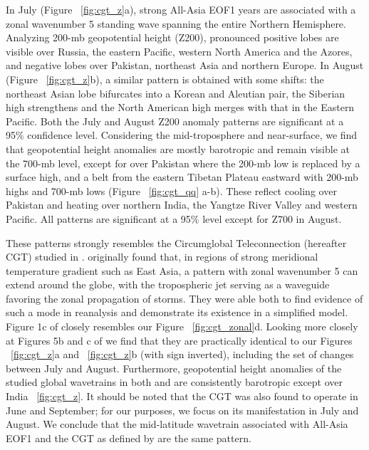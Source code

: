 	In July (Figure ~\ref{fig:cgt_z}a), strong All-Asia EOF1 years are associated with a zonal wavenumber 5 standing wave spanning the entire Northern Hemisphere. Analyzing 200-mb geopotential height (Z200),  pronounced positive lobes are visible over Russia, the eastern Pacific, western North America and the Azores, and negative lobes over Pakistan, northeast Asia and northern Europe. In August (Figure ~\ref{fig:cgt_z}b), a similar pattern is obtained with some shifts: the northeast Asian lobe bifurcates into a Korean and Aleutian pair, the Siberian high strengthens and the North American high merges with that in the Eastern Pacific. Both the July and August Z200 anomaly patterns are significant at a 95\% confidence level. Considering the mid-troposphere and near-surface, we find that geopotential height anomalies are mostly barotropic and remain visible at the 700-mb level, except for over Pakistan where the 200-mb low is replaced by a surface high, and a belt from the eastern Tibetan Plateau eastward with 200-mb highs and 700-mb lows (Figure ~\ref{fig:cgt_qq} a-b). These reflect cooling over Pakistan and heating over northern India, the Yangtze River Valley and western Pacific. All patterns are significant at a 95\% level except for Z700 in August.
	
	These patterns strongly resembles the Circumglobal Teleconnection (hereafter CGT) studied in \citet{Ding2005a}. \citet{Branstator2002} originally found that, in regions of strong meridional temperature gradient such as East Asia, a pattern with zonal wavenumber 5 can extend around the globe, with the tropospheric jet serving as a waveguide favoring the zonal propagation of storms. They were able both to find evidence of such a mode in reanalysis and demonstrate its existence in a simplified model. Figure 1c of \citet{Branstator2002} closely resembles our Figure ~\ref{fig:cgt_zonal}d. Looking more closely at Figures 5b and c of \citet{Ding2005a} we find that they are practically identical to our Figures ~\ref{fig:cgt_z}a and ~\ref{fig:cgt_z}b (with sign inverted), including the set of changes between July and August. Furthermore, geopotential height anomalies of the studied global wavetrains in both \citet{Branstator2002} and \citet{Ding2005a} are consistently barotropic except over India ~\ref{fig:cgt_z}. It should be noted that the CGT was also found to operate in June and September; for our purposes, we focus on its manifestation in July and August. We conclude that the mid-latitude wavetrain associated with All-Asia EOF1 and the CGT as defined by \citet{Ding2005a} are the same pattern.
	
